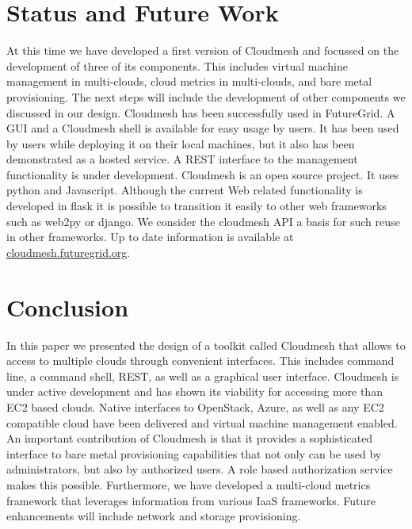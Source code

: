 \documentclass{tex/sig-alternate-2013}
\begin{document}
\section{Status and Future Work}

At this time we have developed a first version of Cloudmesh and
focussed on the development of three of its components. This includes
virtual machine management in multi-clouds, cloud metrics in
multi-clouds, and bare metal provisioning. The next steps will include
the development of other components we discussed in our
design. Cloudmesh has been successfully used in FutureGrid. A GUI and a
Cloudmesh shell is available for easy usage by users. It has been used
by users while deploying it on their local machines, but it also has
been demonstrated as a hosted service. A REST interface to the
management functionality is under development. Cloudmesh is an open
source project. It uses python and Javascript. Although the current
Web related functionality is developed in flask it is possible to
transition it easily to other web frameworks such as web2py or
django. We consider the cloudmesh API a basis for such reuse in other
frameworks.  Up to date information is available at
\url{cloudmesh.futuregrid.org}.

\section{Conclusion}\label{S:conclusion}

In this paper we presented the design of a toolkit called Cloudmesh
that allows to access to multiple clouds through convenient
interfaces. This includes command line, a command shell, REST, as well
as a graphical user interface. Cloudmesh is under active development
and has shown its viability for accessing more than EC2 based
clouds. Native interfaces to OpenStack, Azure, as well as any EC2
compatible cloud have been delivered and virtual machine management
enabled. An important contribution of Cloudmesh is that it provides a
sophisticated interface to bare metal provisioning capabilities that
not only can be used by administrators, but also by authorized
users. A role based authorization service makes this possible.
Furthermore, we have developed a multi-cloud metrics
framework that leverages information from various IaaS
frameworks. Future enhancements will include network and
storage provisioning.
 
\end{document}
